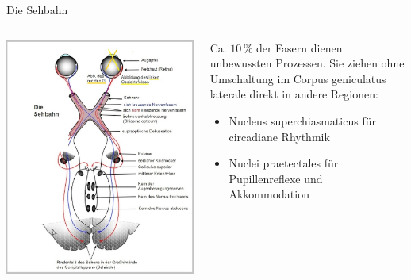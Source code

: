 \documentclass{beamer}
\begin{document}
\begin{frame}{Die Sehbahn}

\begin{columns}[c]

\begin{column}{6cm}
\begin{center}
        \includegraphics[width=\textwidth]{Sehbahn_mit_Chiasma_opticum.jpg}
\end{center}

\end{column}


\begin{column}{6cm}

 Ca. \(10\,\%\) der Fasern dienen unbewussten Prozessen. Sie ziehen ohne Umschaltung im Corpus geniculatus laterale direkt in andere Regionen: 
   
\begin{itemize}
    \item 
    Nucleus superchiasmaticus für circadiane Rhythmik
    \item
Nuclei praetectales für Pupillenreflexe und Akkommodation 

\end{itemize}
\end{column}


\end{columns}

\end{frame}
\end{document}
